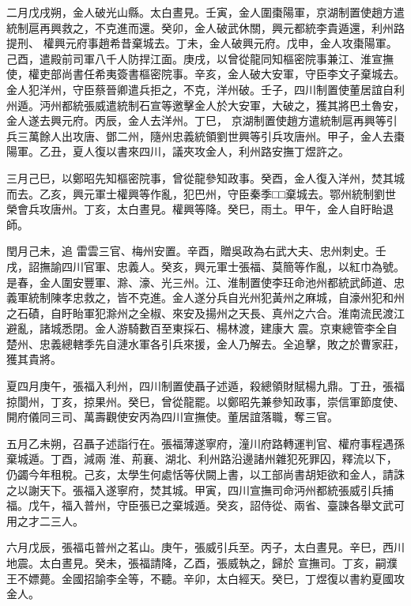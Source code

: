 \begin{pinyinscope}
 二月戊戌朔，金人破光山縣。太白晝見。壬寅，金人圍棗陽軍，京湖制置使趙方遣統制扈再興救之，不克進而還。癸卯，金人破武休關，興元都統李貴遁還，利州路提刑、
 權興元府事趙希昔棄城去。丁未，金人破興元府。戊申，金人攻棗陽軍。己酉，遣殿前司軍八千人防捍江面。庚戌，以曾從龍同知樞密院事兼江、淮宣撫使，權吏部尚書任希夷簽書樞密院事。辛亥，金人破大安軍，守臣李文子棄城去。金人犯洋州，守臣蔡晉卿遣兵拒之，不克，洋州破。壬子，四川制置使董居誼自利州遁。沔州都統張威遣統制石宣等邀擊金人於大安軍，大破之，獲其將巴土魯安，金人遂去興元府。丙辰，金人去洋州。丁巳，
 京湖制置使趙方遣統制扈再興等引兵三萬餘人出攻唐、鄧二州，隨州忠義統領劉世興等引兵攻唐州。甲子，金人去棗陽軍。乙丑，夏人復以書來四川，議夾攻金人，利州路安撫丁煜許之。



 三月己巳，以鄭昭先知樞密院事，曾從龍參知政事。癸酉，金人復入洋州，焚其城而去。乙亥，興元軍士權興等作亂，犯巴州，守臣秦季□□棄城去。鄂州統制劉世榮會兵攻唐州。丁亥，太白晝見。權興等降。癸巳，雨土。甲午，金人自盱眙退師。



 閏月己未，追
 雷雲三官、梅州安置。辛酉，贈吳政為右武大夫、忠州刺史。壬戌，詔撫諭四川官軍、忠義人。癸亥，興元軍士張福、莫簡等作亂，以紅巾為號。是春，金人圍安豐軍、滁、濠、光三州。江、淮制置使李玨命池州都統武師道、忠義軍統制陳孝忠救之，皆不克進。金人遂分兵自光州犯黃州之麻城，自濠州犯和州之石磧，自盱眙軍犯滁州之全椒、來安及揚州之天長、真州之六合。淮南流民渡江避亂，諸城悉閉。金人游騎數百至東採石、楊林渡，建康大
 震。京東總管李全自楚州、忠義總轄季先自漣水軍各引兵來援，金人乃解去。全追擊，敗之於曹家莊，獲其貴將。



 夏四月庚午，張福入利州，四川制置使聶子述遁，殺總領財賦楊九鼎。丁丑，張福掠閬州，丁亥，掠果州。癸巳，曾從龍罷。以鄭昭先兼參知政事，崇信軍節度使、開府儀同三司、萬壽觀使安丙為四川宣撫使。董居誼落職，奪三官。



 五月乙未朔，召聶子述詣行在。張福薄遂寧府，潼川府路轉運判官、權府事程遇孫棄城遁。丁酉，減兩
 淮、荊襄、湖北、利州路沿邊諸州雜犯死罪囚，釋流以下，仍蠲今年租稅。己亥，太學生何處恬等伏闕上書，以工部尚書胡矩欲和金人，請誅之以謝天下。張福入遂寧府，焚其城。甲寅，四川宣撫司命沔州都統張威引兵捕福。戊午，福入普州，守臣張已之棄城遁。癸亥，詔侍從、兩省、臺諫各舉文武可用之才二三人。



 六月戊辰，張福屯普州之茗山。庚午，張威引兵至。丙子，太白晝見。辛巳，西川地震。太白晝見。癸未，張福請降，乙酉，張威執之，歸於
 宣撫司。丁亥，嗣濮王不嫖薨。金國招諭李全等，不聽。辛卯，太白經天。癸巳，丁煜復以書約夏國攻金人。




\end{pinyinscope}
